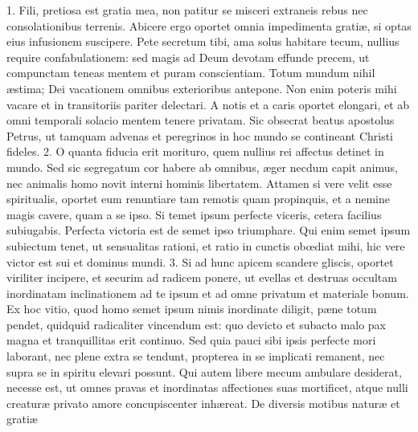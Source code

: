 1. Fili, pretiosa est gratia mea, non patitur se misceri extraneis rebus nec consolationibus terrenis. Abicere ergo oportet omnia impedimenta gratiæ, si optas eius infusionem suscipere. Pete secretum tibi, ama solus habitare tecum, nullius require confabulationem: sed magis ad Deum devotam effunde precem, ut compunctam teneas mentem et puram conscientiam. Totum mundum nihil æstima; Dei vacationem omnibus exterioribus antepone. Non enim poteris mihi vacare et in transitoriis pariter delectari. A notis et a caris oportet elongari, et ab omni temporali solacio mentem tenere privatam. Sic obsecrat beatus apostolus Petrus, ut tamquam advenas et peregrinos in hoc mundo se contineant Christi fideles.
2. O quanta fiducia erit morituro, quem nullius rei affectus detinet in mundo. Sed sic segregatum cor habere ab omnibus, æger necdum capit animus, nec animalis homo novit interni hominis libertatem. Attamen si vere velit esse spiritualis, oportet eum renuntiare tam remotis quam propinquis, et a nemine magis cavere, quam a se ipso. Si temet ipsum perfecte viceris, cetera facilius subiugabis. Perfecta victoria est de semet ipso triumphare. Qui enim semet ipsum subiectum tenet, ut sensualitas rationi, et ratio in cunctis obœdiat mihi, hic vere victor est sui et dominus mundi.
3. Si ad hunc apicem scandere gliscis, oportet viriliter incipere, et securim ad radicem ponere, ut evellas et destruas occultam inordinatam inclinationem ad te ipsum et ad omne privatum et materiale bonum. Ex hoc vitio, quod homo semet ipsum nimis inordinate diligit, pæne totum pendet, quidquid radicaliter vincendum est: quo devicto et subacto malo pax magna et tranquillitas erit continuo. Sed quia pauci sibi ipsis perfecte mori laborant, nec plene extra se tendunt, propterea in se implicati remanent, nec supra se in spiritu elevari possunt. Qui autem libere mecum ambulare desiderat, necesse est, ut omnes pravas et inordinatas affectiones suas mortificet, atque nulli creaturæ privato amore concupiscenter inhæreat.
De diversis motibus naturæ et gratiæ

